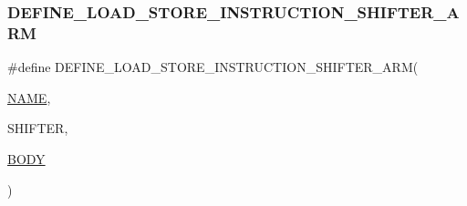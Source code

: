 \subsubsection{\texorpdfstring{D\+E\+F\+I\+N\+E\+\_\+\+L\+O\+A\+D\+\_\+\+S\+T\+O\+R\+E\+\_\+\+I\+N\+S\+T\+R\+U\+C\+T\+I\+O\+N\+\_\+\+S\+H\+I\+F\+T\+E\+R\+\_\+\+A\+RM}{DEFINE\_LOAD\_STORE\_INSTRUCTION\_SHIFTER\_ARM}}
{\footnotesize\ttfamily \#define D\+E\+F\+I\+N\+E\+\_\+\+L\+O\+A\+D\+\_\+\+S\+T\+O\+R\+E\+\_\+\+I\+N\+S\+T\+R\+U\+C\+T\+I\+O\+N\+\_\+\+S\+H\+I\+F\+T\+E\+R\+\_\+\+A\+RM(\begin{DoxyParamCaption}\item[{}]{\mbox{\hyperlink{inflate_8h_a164ea0159d5f0b5f12a646f25f99eceaa67bc2ced260a8e43805d2480a785d312}{N\+A\+ME}},  }\item[{}]{S\+H\+I\+F\+T\+ER,  }\item[{}]{\mbox{\hyperlink{gzlog_8c_aa6bdf6a6d9916c343e1e17774d84a156}{B\+O\+DY}} }\end{DoxyParamCaption})}

